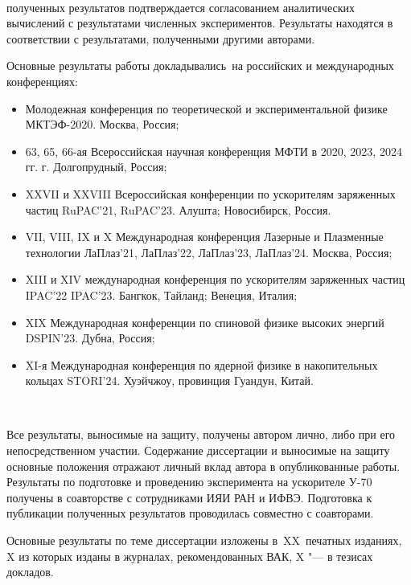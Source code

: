~\\
\par {\reliability} полученных результатов подтверждается согласованием аналитических вычислений с результатами численных экспериментов. Результаты находятся в соответствии с результатами, полученными другими авторами.
~\\
\par {\probation}
Основные результаты работы докладывались~на российских и международных конференциях: 
\begin{itemize}
\item Молодежная конференция по теоретической и экспериментальной физике МКТЭФ-2020. Москва, Россия;
\item 63, 65, 66-ая Всероссийская научная конференция МФТИ в 2020, 2023, 2024 гг. г. Долгопрудный,
Россия;
\item XXVII и XXVIII Всероссийская конференции по ускорителям заряженных частиц RuPAC'21, RuPAC'23. Алушта; Новосибирск, Россия.
\item VII, VIII, IX и X Международная конференция Лазерные и Плазменные технологии ЛаПлаз'21, ЛаПлаз'22, ЛаПлаз'23, ЛаПлаз'24. Москва, Россия;
\item XIII и XIV международная конференция по ускорителям заряженных частиц IPAC'22 IPAC'23. Бангкок, Тайланд; Венеция, Италия;
\item XIX Международная конференции по спиновой физике высоких энергий DSPIN'23. Дубна, Россия;
\item XI-я Международная конференция по ядерной физике в накопительных кольцах STORI’24. Хуэйчжоу, провинция Гуандун, Китай.
\end{itemize}
~\\
\par {\contribution} Все результаты, выносимые на защиту, получены автором лично, либо при его непосредственном участии. Содержание диссертации и выносимые на защиту основные положения отражают личный вклад автора в опубликованные работы. Результаты по подготовке и проведению эксперимента на ускорителе У-70 получены в соавторстве с сотрудниками ИЯИ РАН и ИФВЭ. Подготовка к публикации полученных результатов проводилась совместно с соавторами.
~\\
\par {}
{%
 {\publications} Основные результаты по теме диссертации изложены
    в~XX~печатных изданиях,
    X из которых изданы в журналах, рекомендованных ВАК,
    X "--- в тезисах докладов.
}%
